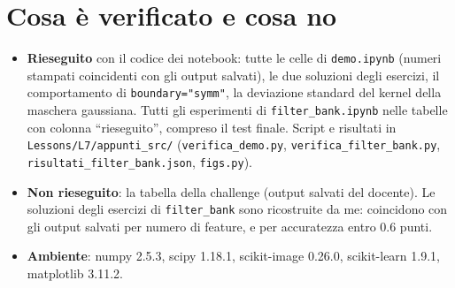 \documentclass[11pt,a4paper]{article}
\newcommand{\code}[1]{\texttt{#1}}
\begin{document}
\section*{Cosa è verificato e cosa no}
\begin{itemize}
  \item \textbf{Rieseguito} con il codice dei notebook: tutte le celle di \code{demo.ipynb} (numeri stampati coincidenti con gli output salvati), le due soluzioni degli esercizi, il comportamento di \code{boundary="symm"}, la deviazione standard del kernel della maschera gaussiana. Tutti gli esperimenti di \code{filter\_bank.ipynb} nelle tabelle con colonna ``rieseguito'', compreso il test finale. Script e risultati in \code{Lessons/L7/appunti\_src/} (\code{verifica\_demo.py}, \code{verifica\_filter\_bank.py}, \code{risultati\_filter\_bank.json}, \code{figs.py}).
  \item \textbf{Non rieseguito}: la tabella della challenge (output salvati del docente). Le soluzioni degli esercizi di \code{filter\_bank} sono ricostruite da me: coincidono con gli output salvati per numero di feature, e per accuratezza entro 0.6 punti.
  \item \textbf{Ambiente}: numpy 2.5.3, scipy 1.18.1, scikit-image 0.26.0, scikit-learn 1.9.1, matplotlib 3.11.2.
\end{itemize}
\end{document}
